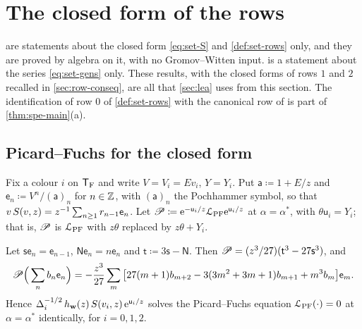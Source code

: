 \section{The closed form of the rows}
\label{sec:row}

 are statements about the closed form \eqref{eq:set-S} and \cref{def:set-rows} only, and they are proved by algebra on it, with no Gromov--Witten input.  is a statement about the series \eqref{eq:set-gens} only. These results, with the closed forms of rows $1$ and $2$  recalled in \cref{sec:row-conseq}, are all that \cref{sec:lea} uses from this section. The identification of row $0$ of \cref{def:set-rows} with the canonical row of \cite{BS} is part of \cref{thm:spe-main}\textup{(a)}.

\subsection{Picard--Fuchs for the closed form}
\label{sec:row-pf}

Fix a colour $i$ on $\mathsf{T}_{\mathrm{F}}$ and write $V=V_i=Ev_i$, $Y=Y_i$. Put $\mathsf{a}\coloneqq1+E/z$ and $\mathsf{e}_n\coloneqq V^n/(\mathsf{a})_n$ for $n\in\mathbb{Z}$, with $(\mathsf{a})_n$ the Pochhammer symbol, so that $v\,S(v,z)=z^{-1}\sum_{n\geq1}r_{n-1}\mathsf{e}_n$. Let $\mathscr{P}\coloneqq\mathrm{e}^{-\mathsf{u}_i/z}\mathcal{L}_{\mathrm{PF}}\mathrm{e}^{\mathsf{u}_i/z}$ at $\alpha=\alpha^*$, with $\theta\mathsf{u}_i=Y_i$; that is, $\mathscr{P}$ is $\mathcal{L}_{\mathrm{PF}}$ with $z\theta$ replaced by $z\theta+Y_i$.

\begin{thm}[{\Lg{Theorem~3.1}}]
\label{thm:row-pf}
Let $\mathsf{s}\mathsf{e}_n=\mathsf{e}_{n-1}$, $\mathsf{N}\mathsf{e}_n=n\mathsf{e}_n$ and $\mathsf{t}\coloneqq3\mathsf{s}-\mathsf{N}$. Then $\mathscr{P}=(z^3/27)(\mathsf{t}^3-27\mathsf{s}^3)$, and
\begin{equation}
\label{eq:row-pfcoef}
\mathscr{P}\Big(\sum_nb_n\mathsf{e}_n\Big)=-\frac{z^3}{27}\sum_m\big[27(m+1)b_{m+2}-3(3m^2+3m+1)b_{m+1}+m^3b_m\big]\mathsf{e}_m .
\end{equation}
Hence $\Delta_i^{-1/2}\,h_{\mathbf{w}}(z)\,S(v_i,z)\,\mathrm{e}^{\mathsf{u}_i/z}$ solves the Picard--Fuchs equation $\mathcal{L}_{\mathrm{PF}}(\cdot)=0$ at $\alpha=\alpha^*$ identically, for $i=0,1,2$.
\end{thm}

